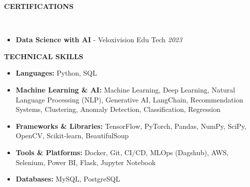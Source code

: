 \documentclass[a4paper,10pt]{article}
\newcommand{\lsep}{-0.5cm}
\newcommand{\resheading}[1]{%
  \par\noindent%
  \small%
  \colorbox{mygrey}{%
    \parbox{\dimexpr\linewidth-2\fboxsep\relax}{%
      \textbf{#1}%
    }%
  }%
  \par\nobreak%
}
\begin{document}
\resheading{\textbf{CERTIFICATIONS} }\\[\lsep]
\begin{itemize}
\item {\bf Data Science with AI} - Veloxivision Edu Tech \hfill \textit{2023}
\end{itemize}



\resheading{\textbf{TECHNICAL SKILLS} }
\begin{itemize}
\vspace{-1mm}

\item \textbf{Languages:} Python, SQL  

\vspace{-1mm}
\item \textbf{Machine Learning \& AI:} Machine Learning, Deep Learning, Natural Language Processing (NLP), Generative AI, LangChain, Recommendation Systems, Clustering, Anomaly Detection, Classification, Regression

\vspace{-1mm}
\item \textbf{Frameworks \& Libraries:} TensorFlow, PyTorch, Pandas, NumPy, SciPy, OpenCV, Scikit-learn, BeautifulSoup

\vspace{-1mm}
\item \textbf{Tools \& Platforms:} Docker, Git, CI/CD, MLOps (Dagshub), AWS, Selenium, Power BI, Flask, Jupyter Notebook

\vspace{-1mm}
\item \textbf{Databases:} MySQL, PostgreSQL

\vspace{-4mm}
\end{itemize}
\end{document}
